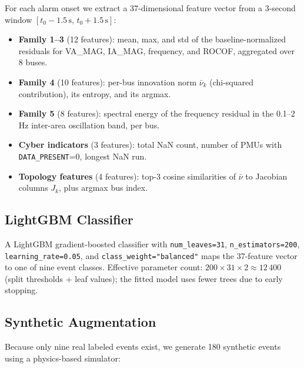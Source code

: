 \documentclass[conference]{IEEEtran}
\begin{document}
For each alarm onset we extract a 37-dimensional feature vector from a
3-second window $[t_0-1.5\,\text{s},\, t_0+1.5\,\text{s}]$:

\begin{itemize}
  \item \textbf{Family 1--3} (12 features): mean, max, and std of the
    baseline-normalized residuals for VA\_MAG, IA\_MAG, frequency, and ROCOF,
    aggregated over 8 buses.
  \item \textbf{Family 4} (10 features): per-bus innovation norm
    $\bar\nu_k$ (chi-squared contribution), its entropy, and its argmax.
  \item \textbf{Family 5} (8 features): spectral energy of the frequency
    residual in the 0.1--2\,Hz inter-area oscillation band, per bus.
  \item \textbf{Cyber indicators} (3 features): total NaN count,
    number of PMUs with \texttt{DATA\_PRESENT}=0, longest NaN run.
  \item \textbf{Topology features} (4 features): top-3 cosine similarities
    of $\bar\nu$ to Jacobian columns $J_k$, plus argmax bus index.
\end{itemize}

\subsection{LightGBM Classifier}

A LightGBM gradient-boosted classifier with \texttt{num\_leaves=31},
\texttt{n\_estimators=200}, \texttt{learning\_rate=0.05}, and
\texttt{class\_weight="balanced"} maps the 37-feature vector to one of
nine event classes.  Effective parameter count:
$200 \times 31 \times 2 \approx 12\,400$ (split thresholds + leaf values);
the fitted model uses fewer trees due to early stopping.

\subsection{Synthetic Augmentation}

Because only nine real labeled events exist, we generate 180 synthetic
events using a physics-based simulator:
\end{document}

